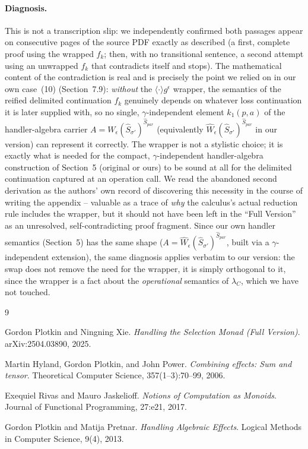 \documentclass[11pt]{article}
\theoremstyle{plain}
\newcommand{\Sm}[1]{\widehat{S}_{#1}}
\newcommand{\eps}{\epsilon}
\newcommand{\lC}{\lambda_C}
\begin{document}
\paragraph{Diagnosis.} This is not a transcription slip: we independently confirmed both
passages appear on consecutive pages of the source PDF exactly as described (a first, complete
proof using the wrapped $f_k$; then, with no transitional sentence, a second attempt using an
unwrapped $f_k$ that contradicts itself and stops). The mathematical content of the
contradiction is real and is precisely the point we relied on in our own case~(10)
(Section~7.9): \emph{without} the $\langle\cdot\rangle g^\eps$ wrapper, the semantics of the
reified delimited continuation $f_k$ genuinely depends on whatever loss continuation it is later
supplied with, so no single, $\gamma$-independent element $k_1(p,a)$ of the handler-algebra
carrier $A = W_\eps(\Sm{\sigma'})^{\Sm{\mathit{par}}}$ (equivalently $\widehat
W_\eps(\Sm{\sigma'})^{\Sm{\mathit{par}}}$ in our version) can represent it correctly. The
wrapper is not a stylistic choice; it is exactly what is needed for the compact,
$\gamma$-independent handler-algebra construction of Section~5 (original or ours) to be sound
at all for the delimited continuation captured at an operation call. We read the abandoned
second derivation as the authors' own record of discovering this necessity in the course of
writing the appendix -- valuable as a trace of \emph{why} the calculus's actual reduction rule
includes the wrapper, but it should not have been left in the ``Full Version'' as an
unresolved, self-contradicting proof fragment. Since our own handler semantics (Section~5) has
the same shape ($A=\widehat W_\eps(\Sm{\sigma'})^{\Sm{\mathit{par}}}$, built via a
$\gamma$-independent extension), the same diagnosis applies verbatim to our version: the swap
does not remove the need for the wrapper, it is simply orthogonal to it, since the wrapper is a
fact about the \emph{operational} semantics of $\lC$, which we have not touched.

\begin{thebibliography}{9}

Gordon Plotkin and Ningning Xie.
\emph{Handling the Selection Monad (Full Version)}.
arXiv:2504.03890, 2025.

Martin Hyland, Gordon Plotkin, and John Power.
\emph{Combining effects: Sum and tensor}.
Theoretical Computer Science, 357(1--3):70--99, 2006.

Exequiel Rivas and Mauro Jaskelioff.
\emph{Notions of Computation as Monoids}.
Journal of Functional Programming, 27:e21, 2017.

Gordon Plotkin and Matija Pretnar.
\emph{Handling Algebraic Effects}.
Logical Methods in Computer Science, 9(4), 2013.

\end{thebibliography}
\end{document}
